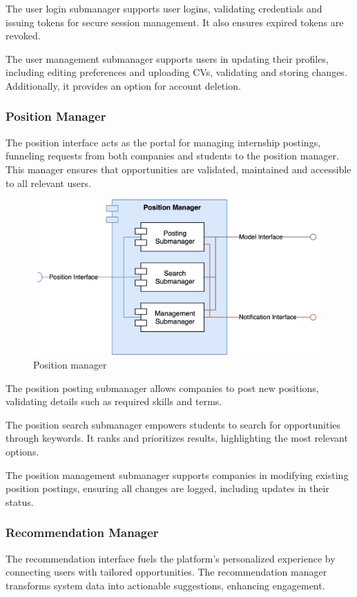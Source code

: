 The user login submanager supports user logins, validating credentials and issuing tokens for secure session management.
It also ensures expired tokens are revoked.

The user management submanager supports users in updating their profiles, including editing preferences and uploading CVs, validating and storing changes.
Additionally, it provides an option for account deletion.

\subsubsection{Position Manager}
The position interface acts as the portal for managing internship postings, funneling requests from both companies and students to the position manager.
This manager ensures that opportunities are validated, maintained and accessible to all relevant users.

\begin{figure}[h]
    \centering
    \includegraphics[width=11cm]{images/managers/position.png}
    \caption{Position manager}
\end{figure}

The position posting submanager allows companies to post new positions, validating details such as required skills and terms.

The position search submanager empowers students to search for opportunities through keywords.
It ranks and prioritizes results, highlighting the most relevant options.

The position management submanager supports companies in modifying existing position postings, ensuring all changes are logged, including updates in their status.

\subsubsection{Recommendation Manager}
The recommendation interface fuels the platform’s personalized experience by connecting users with tailored opportunities.
The recommendation manager transforms system data into actionable suggestions, enhancing engagement.

